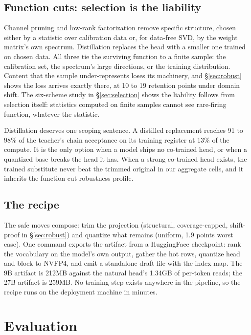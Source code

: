 \documentclass{article}
\begin{document}
\subsection{Function cuts: selection is the liability}
\label{sec:function}

Channel pruning and low-rank factorization remove specific structure, chosen either by a statistic over calibration data or, for data-free SVD, by the weight matrix's own spectrum. Distillation replaces the head with a smaller one trained on chosen data. All three tie the surviving function to a finite sample: the calibration set, the spectrum's large directions, or the training distribution. Content that the sample under-represents loses its machinery, and \S\ref{sec:robust} shows the loss arrives exactly there, at 10 to 19 retention points under domain shift. The six-scheme study in \S\ref{sec:selection} shows the liability follows from selection itself: statistics computed on finite samples cannot see rare-firing function, whatever the statistic.

Distillation deserves one scoping sentence. A distilled replacement reaches 91 to 98\% of the teacher's chain acceptance on its training register at 13\% of the compute. It is the only option when a model ships no co-trained head, or when a quantized base breaks the head it has. When a strong co-trained head exists, the trained substitute never beat the trimmed original in our aggregate cells, and it inherits the function-cut robustness profile.

\subsection{The recipe}
\label{sec:recipe}

The safe moves compose: trim the projection (structural, coverage-capped, shift-proof in \S\ref{sec:robust}) and quantize what remains (uniform, 1.9 points worst case). One command exports the artifact from a HuggingFace checkpoint: rank the vocabulary on the model's own output, gather the hot rows, quantize head and block to NVFP4, and emit a standalone draft file with the index map. The 9B artifact is 212MB against the natural head's 1.34GB of per-token reads; the 27B artifact is 259MB. No training step exists anywhere in the pipeline, so the recipe runs on the deployment machine in minutes.

\section{Evaluation}
\label{sec:eval}
\end{document}
